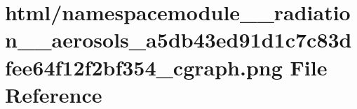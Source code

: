 \hypertarget{namespacemodule____radiation____aerosols__a5db43ed91d1c7c83dfee64f12f2bf354__cgraph_8png}{}\section{html/namespacemodule\+\_\+\+\_\+radiation\+\_\+\+\_\+aerosols\+\_\+a5db43ed91d1c7c83dfee64f12f2bf354\+\_\+cgraph.png File Reference}
\label{namespacemodule____radiation____aerosols__a5db43ed91d1c7c83dfee64f12f2bf354__cgraph_8png}
